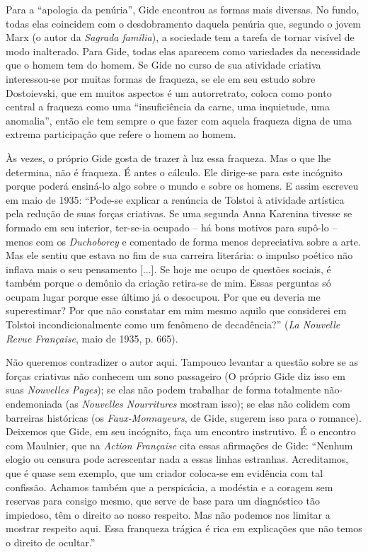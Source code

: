 Para a ``apologia da penúria'', Gide encontrou as formas mais diversas.
No fundo, todas elas coincidem com o desdobramento daquela penúria que,
segundo o jovem Marx (o autor da \emph{Sagrada família}), a sociedade
tem a tarefa de tornar visível de modo inalterado. Para Gide, todas elas
aparecem como variedades da necessidade que o homem tem do homem. Se
Gide no curso de sua atividade criativa interessou-se por muitas formas
de fraqueza, se ele em seu estudo sobre Dostoievski, que em muitos
aspectos é um autorretrato, coloca como ponto central a fraqueza como
uma ``insuficiência da carne, uma inquietude, uma anomalia'', então ele
tem sempre o que fazer com aquela fraqueza digna de uma extrema
participação que refere o homem ao homem.

Às vezes, o próprio Gide gosta de trazer à luz essa fraqueza. Mas o que
lhe determina, não é fraqueza. É antes o cálculo. Ele dirige-se para
este incógnito porque poderá ensiná-lo algo sobre o mundo e sobre os
homens. E assim escreveu em maio de 1935: ``Pode-se explicar a renúncia
de Tolstoi à atividade artística pela redução de suas forças criativas.
Se uma segunda Anna Karenina tivesse se formado em seu interior,
ter-se-ia ocupado -- há bons motivos para supô-lo -- menos com os
\emph{Duchoborcy} e comentado de forma menos depreciativa sobre a arte.
Mas ele sentiu que estava no fim de sua carreira literária: o impulso
poético não inflava mais o seu pensamento {[}...{]}. Se hoje me ocupo de
questões sociais, é também porque o demônio da criação retira-se de mim.
Essas perguntas só ocupam lugar porque esse último já o desocupou. Por
que eu deveria me superestimar? Por que não constatar em mim mesmo
aquilo que considerei em Tolstoi incondicionalmente como um fenômeno de
decadência?'' (\emph{La Nouvelle Revue Française}, maio de 1935, p.
665).

Não queremos contradizer o autor aqui. Tampouco levantar a questão sobre
se as forças criativas não conhecem um sono passageiro (O próprio Gide
diz isso em suas \emph{Nouvelles Pages}); se elas não podem trabalhar de
forma totalmente não-endemoniada (as \emph{Nouvelles Nourritures}
mostram isso); se elas não colidem com barreiras históricas (os
\emph{Faux-Monnayeurs}, de Gide, sugerem isso para o romance). Deixemos
que Gide, em seu incógnito, faça um encontro instrutivo. É o encontro
com Maulnier, que na \emph{Action Française} cita essas afirmações de
Gide: ``Nenhum elogio ou censura pode acrescentar nada a essas linhas
estranhas. Acreditamos, que é quase sem exemplo, que um criador
coloca-se em evidência com tal confissão. Achamos também que a
perspicácia, a modéstia e a coragem sem reservas para consigo mesmo, que
serve de base para um diagnóstico tão impiedoso, têm o direito ao nosso
respeito. Mas não podemos nos limitar a mostrar respeito aqui. Essa
franqueza trágica é rica em explicações que não temos o direito de
ocultar.''

